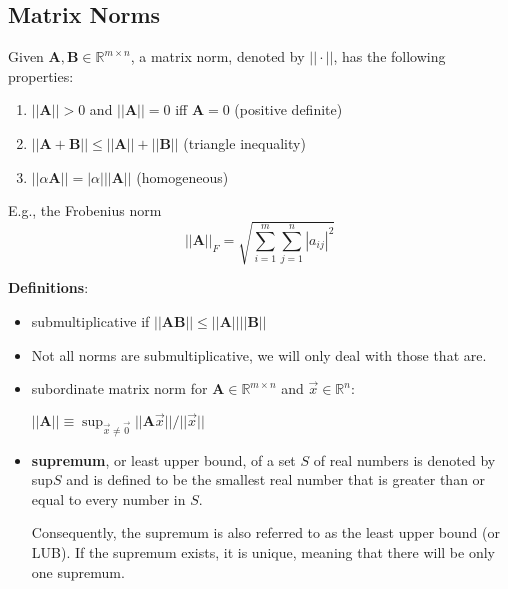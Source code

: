 \documentclass[12pt]{article}
\newcommand{\ve}[1]{\ensuremath{\mathbf{#1}}}
\begin{document}
\subsection{Matrix Norms}
Given $\ve{A}, \ve{B} \in \mathbb{R}^{m \times n}$, a matrix norm, denoted by $|| \cdot ||$, has the following properties:
%
\begin{enumerate}
\item $||\ve{A}|| > 0$ and $||\ve{A}|| = 0$ iff $\ve{A} = 0$ (positive definite)
\item $||\ve{A} + \ve{B}|| \leq ||\ve{A}|| + ||\ve{B}||$ (triangle inequality)
\item $||\alpha \ve{A}|| = |\alpha| ||\ve{A}||$ (homogeneous)
\end{enumerate}

E.g., the Frobenius norm 
%
\begin{equation}
||\ve{A}||_F = \sqrt{ \sum_{i=1}^m \sum_{j=1}^n |a_{ij}|^2 } \nonumber
\end{equation}

\textbf{Definitions}:
\begin{itemize}
\item submultiplicative if $||\ve{A} \ve{B}|| \leq ||\ve{A}|| ||\ve{B}||$

\item Not all norms are submultiplicative, we will only deal with those that are. 

\item subordinate matrix norm for $\ve{A} \in \mathbb{R}^{m \times n}$ and $\vec{x} \in \mathbb{R}^n$:

$||\ve{A}|| \equiv \displaystyle \sup_{\vec{x} \neq \vec{0}} ||\ve{A}\vec{x}|| / ||\vec{x}||$

\item \textbf{supremum}, or least upper bound, of a set $S$ of real numbers is denoted by sup$S$ and is defined to be the smallest real number that is greater than or equal to every number in $S$.

Consequently, the supremum is also referred to as the least upper bound (or LUB). If the supremum exists, it is unique, meaning that there will be only one supremum. 
\end{itemize}
\end{document}
